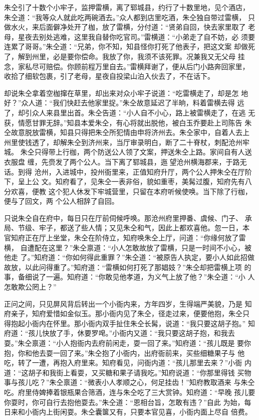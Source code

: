 朱仝引了十数个小牢子，监押雷横，离了郓城县，约行了十数里地，见个酒店，
朱仝道：“我等众人就此吃两碗酒去。”众人都到店里吃酒，朱仝独自带过雷横，
只做水火，来后面僻净处开了枷，放了雷横，分付道：“贤弟自回，快去家里取了
老母，星夜去别处逃难，这里我自替你吃官司。”雷横道：“小弟走了自不妨，必
须要连累了哥哥。”朱仝道：“兄弟，你不知，知县怪你打死了他表子，把这文案
却做死了，解到州里，必是要你偿命。我放了你，我须不该死罪。况兼我又无父母
挂念，家私尽可赔偿。你顾前程万里自去。”雷横拜谢了，便从后门小路奔回家里，
收拾了细软包裹，引了老母，星夜自投梁山泊入伙去了，不在话下。

却说朱仝拿着空枷撺在草里，却出来对众小牢子说道：“吃雷横走了，却是怎
地好？”众人道：“我们快赶去他家里捉。”朱仝故意延迟了半晌，料着雷横去得
远了，却引众人来县里出首。朱仝告道：“小人自不小心，路上被雷横走了，在逃
无获，情愿甘罪无辞。”知县本爱朱仝，有心将就出脱他，被白玉乔要赴上司陈告
朱仝故意脱放雷横，知县只得把朱仝所犯情由申将济州去。朱仝家中，自着人去上
州里使钱透了，却解朱仝到济州来，当厅审录明白，断了二十脊杖，刺配沧州牢城。
朱仝只得带上行枷，两个防送公人领了文案，押送朱仝上路。家间自有人送衣服盘
缠，先赍发了两个公人。当下离了郓城县，迤望沧州横海郡来，于路无话。到得
沧州，入进城中，投州衙里来，正值知府升厅，两个公人押朱仝在厅阶下，呈上公
文。知府看了，见朱仝一表非俗，貌如重枣，美髯过腹，知府先有八分欢喜，便教
这个犯人休发下牢城营里，只留在本府听候使唤。当下除了行枷，便与了回文，两
个公人相辞了自回。

只说朱仝自在府中，每日只在厅前伺候呼唤。那沧州府里押番、虞候、门子、
承局、节级、牢子，都送了些人情；又见朱仝和气，因此上都欢喜他。忽一日，本
官知府正在厅上坐堂，朱仝在阶侍立，知府唤朱仝上厅，问道：“你缘何放了雷横，
自遭配在这里？”朱仝禀道：“小人怎敢故放了雷横，只是一时间不小心，被他走
了。”知府道：“你如何得此重罪？”朱仝道：“被原告人执定，要小人如此招做
故放，以此问得重了。”知府道：“雷横如何打死了那娼妓？”朱仝却把雷横上项
的事，备细说了一遍。知府道：“你敢见他孝道，为义气上放了他？”朱仝道：“小
人怎敢欺公罔上？”

正问之间，只见屏风背后转出一个小衙内来，方年四岁，生得端严美貌，乃是
知府亲子，知府爱惜如金似玉。那小衙内见了朱仝，径走过来，便要他抱，朱仝只
得抱起小衙内在怀里。那小衙内双手扯住朱仝长髯，说道：“我只要这胡子抱。”
知府道：“孩儿快放了手，休要罗唣。”小衙内又道：“我只要这胡子抱，和我去
耍。”朱仝禀道：“小人抱衙内去府前闲走，耍一回了来。”知府道：“孩儿既是
要你抱，你和他去耍一回了来。”朱仝抱了小衙内，出府衙前来，买些细糖果子与
他吃，转了一遭，再抱入府里来。知府看见，问衙内道：“孩儿那里去来？”小衙
内道：“这胡子和我街上看耍，又买糖和果子请我吃。”知府说道：“你那里得钱
买物事与孩儿吃？”朱仝禀道：“微表小人孝顺之心，何足挂齿！”知府教取酒来
与朱仝吃。府里侍婢捧着银瓶果合筛酒，连与朱仝吃了三大赏钟。知府道：“早晚
孩儿要你耍时，你可自行去抱他耍去。”朱仝道：“恩相台旨，怎敢有违？”自此
为始，每日来和小衙内上街闲耍。朱仝囊箧又有，只要本官见喜，小衙内面上尽自
倍费。

